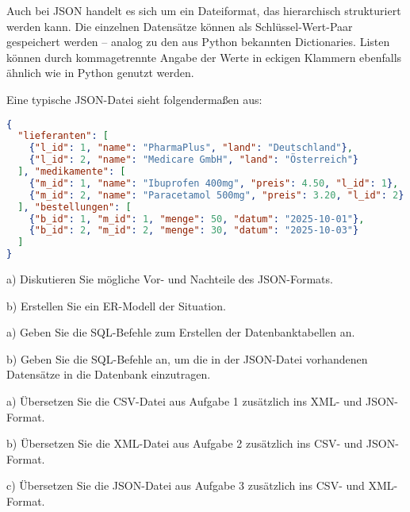 \documentclass[11pt, a4paper, oneside]{article}
\begin{document}
	Auch bei JSON handelt es sich um ein Dateiformat, das hierarchisch strukturiert werden kann.
	Die einzelnen Datensätze können als Schlüssel-Wert-Paar gespeichert werden -- analog zu den aus Python bekannten Dictionaries.
	Listen können durch kommagetrennte Angabe der Werte in eckigen Klammern ebenfalls ähnlich wie in Python genutzt werden.
	
	Eine typische JSON-Datei sieht folgendermaßen aus:
	
	\begin{lstlisting}[language=json]
{
  "lieferanten": [
    {"l_id": 1, "name": "PharmaPlus", "land": "Deutschland"},
    {"l_id": 2, "name": "Medicare GmbH", "land": "Österreich"}
  ], "medikamente": [
    {"m_id": 1, "name": "Ibuprofen 400mg", "preis": 4.50, "l_id": 1},
    {"m_id": 2, "name": "Paracetamol 500mg", "preis": 3.20, "l_id": 2}
  ], "bestellungen": [
    {"b_id": 1, "m_id": 1, "menge": 50, "datum": "2025-10-01"},
    {"b_id": 2, "m_id": 2, "menge": 30, "datum": "2025-10-03"}
  ]
}
	\end{lstlisting}
	
	a) Diskutieren Sie mögliche Vor- und Nachteile des JSON-Formats.
	
	\lines[4cm]
	
	b) Erstellen Sie ein ER-Modell der Situation.
	
	\boxarea[7cm]
	
	
	a) Geben Sie die SQL-Befehle zum Erstellen der Datenbanktabellen an.
	
	\lines[5cm]
	
	b) Geben Sie die SQL-Befehle an, um die in der JSON-Datei vorhandenen Datensätze in die Datenbank einzutragen.
	
	\lines[5cm]
	
	
	a) Übersetzen Sie die CSV-Datei aus Aufgabe 1 zusätzlich ins XML- und JSON-Format.
	
	\boxarea[5.5cm]
	
	b) Übersetzen Sie die XML-Datei aus Aufgabe 2 zusätzlich ins CSV- und JSON-Format.
	
	\boxarea[5.5cm]
	
	c) Übersetzen Sie die JSON-Datei aus Aufgabe 3 zusätzlich ins CSV- und XML-Format.
	
	\boxarea[5.5cm]
	
\end{document}
